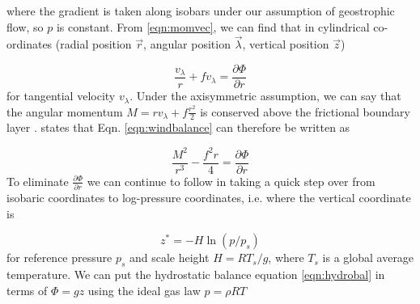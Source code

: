  





where the gradient is taken along isobars under our assumption of geostrophic flow, so $p$ is constant. From \ref{eqn:momvec}, we can find that in cylindrical co-ordinates (radial position $\vec{r}$, angular position $\vec{\lambda}$, vertical position $\vec{z}$)

\begin{equation}
    \frac{v_{\lambda}}{r}+fv_{\lambda}=\frac{\partial \Phi}{\partial r}
    \label{eqn:windbalance}
\end{equation}
for tangential velocity $v_{\lambda}$. Under the axisymmetric assumption, we can say that the angular momentum $M=rv_{\lambda}+f\frac{r^2}{2}$ is conserved above the frictional boundary layer \cite{smith_montgomery_2017}. \cite{holton_hakim_2019} states that Eqn. \ref{eqn:windbalance} can therefore be written as 

\begin{equation}
    \frac{M^2}{r^3}-\frac{f^2r}{4}=\frac{\partial\Phi}{\partial r}
    \label{eqn:windbalance_mom}
\end{equation}
To eliminate $\frac{\partial \Phi}{\partial r}$ we can continue to follow \cite{holton_hakim_2019} in taking a quick step over from isobaric coordinates to log-pressure coordinates, i.e. where the vertical coordinate is 

\begin{equation*}
    z^*=-H\ln(p/p_s)
\end{equation*}
for reference pressure $p_s$ and scale height $H=RT_s/g$, where $T_s$ is a global average temperature. We can put the hydrostatic balance equation \ref{eqn:hydrobal} in terms of $\Phi= gz$ using the ideal gas law $p=\rho RT$

